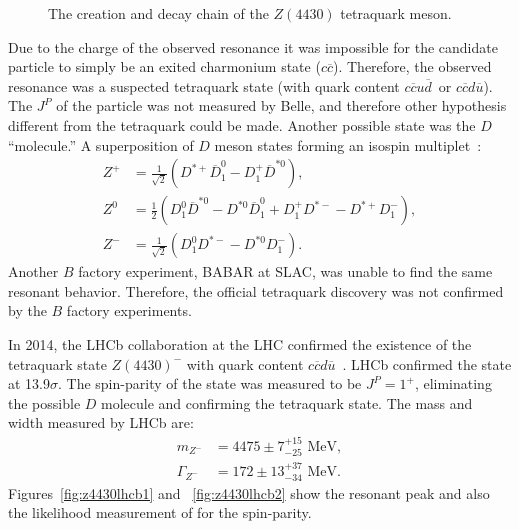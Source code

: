 \documentclass[aps,prd,twocolumn,nofootinbib]{revtex4-1}
\begin{document}
\begin{figure}[H]
  \centerline{}
  \caption{The creation and decay chain of the $Z(4430)$ tetraquark meson.}
  \label{fig:z4430diag}
\end{figure}

Due to the charge of the observed resonance it was impossible for the candidate particle to simply be an exited charmonium state ($c\overline{c}$). Therefore, the observed resonance was a suspected tetraquark state (with quark content $c\overline{c}u\overline{d}$~or $c\overline{c}d\overline{u}$). The $J^P$ of the particle was not measured by Belle, and therefore other hypothesis different from the tetraquark could be made. Another possible state was the $D$ ``molecule.'' A superposition of $D$ meson states forming an isospin multiplet~\cite{z4430_dmolecule}:
\begin{align}
Z^+ &= \frac{1}{\sqrt{2}}\left(D^{*+}\overline{D}^0_1-D^+_1\overline{D}^{*0}\right), \\
Z^0 &= \frac{1}{2}\left(D_1^0\overline{D}^{*0} - D^{*0}\overline{D}_1^0 + D_1^+D^{*-}-D^{*+}D^-_1\right),\\
Z^- &= \frac{1}{\sqrt{2}}\left(D^0_1D^{*-} - D^{*0}D_1^-\right).
\end{align}
Another $B$ factory experiment, BABAR at SLAC, was unable to find the same resonant behavior. Therefore, the official tetraquark discovery was not confirmed by the $B$ factory experiments.

In 2014, the LHCb collaboration at the LHC confirmed the existence of the tetraquark state $Z(4430)^-$ with quark content $c\overline{c}d\overline{u}$~\cite{lhcb}. LHCb confirmed the state at 13.9$\sigma$. The spin-parity of the state was measured to be $J^P = 1^+$, eliminating the possible $D$ molecule and confirming the tetraquark state. The mass and width measured by LHCb are:
\begin{align}
m_{Z^{-}} &= 4475 \pm 7^{+15}_{-25}\text{ MeV},\\
\Gamma_{Z^{-}} &= 172 \pm 13^{+37}_{-34}\text{ MeV}.
\end{align}
Figures~\ref{fig:z4430lhcb1} and ~\ref{fig:z4430lhcb2} show the resonant peak and also the likelihood measurement of for the spin-parity.


\begin{comment}
\begin{figure*}[h!]
  \centerline{\psfig{file=../figures/Z4430_res.pdf, width=.45\linewidth}
  \psfig{file=../figures/Z4430_jp.pdf,width=.45\linewidth}}
  \caption{LHCb plots}
  \label{fig:z4430lhcb}
\end{figure*}
\end{comment}
\end{document}
